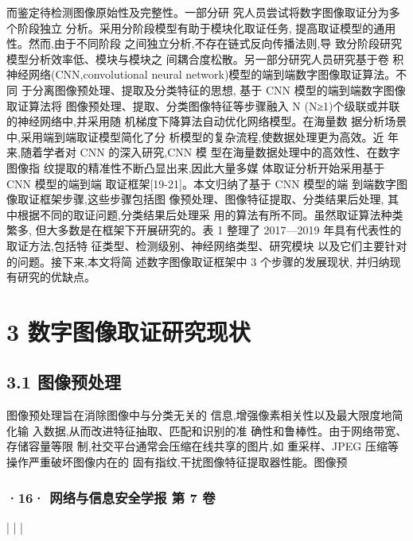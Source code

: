 \documentclass{article}
\begin{document}
而鉴定待检测图像原始性及完整性。一部分研 究人员尝试将数字图像取证分为多个阶段独立 分析。采用分阶段模型有助于模块化取证任务, 提高取证模型的通用性。然而,由于不同阶段 之间独立分析,不存在链式反向传播法则,导 致分阶段研究模型分析效率低、模块与模块之 间耦合度松散。另一部分研究人员研究基于卷 积神经网络(CNN,convolutional neural network)模型的端到端数字图像取证算法。不同 于分离图像预处理、提取及分类特征的思想, 基于 CNN 模型的端到端数字图像取证算法将 图像预处理、提取、分类图像特征等步骤融入 N (N≥1)个级联或并联的神经网络中,并采用随 机梯度下降算法自动优化网络模型。在海量数 据分析场景中,采用端到端取证模型简化了分 析模型的复杂流程,使数据处理更为高效。近 年来,随着学者对 CNN 的深入研究,CNN 模 型在海量数据处理中的高效性、在数字图像指 纹提取的精准性不断凸显出来,因此大量多媒 体取证分析开始采用基于 CNN 模型的端到端 取证框架[19-21]。本文归纳了基于 CNN 模型的端 到端数字图像取证框架步骤,这些步骤包括图 像预处理、图像特征提取、分类结果后处理, 其中根据不同的取证问题,分类结果后处理采 用的算法有所不同。虽然取证算法种类繁多, 但大多数是在框架下开展研究的。表 1 整理了 2017—2019 年具有代表性的取证方法,包括特 征类型、检测级别、神经网络类型、研究模块 以及它们主要针对的问题。接下来,本文将简 述数字图像取证框架中 3 个步骤的发展现状, 并归纳现有研究的优缺点。

\section{3 数字图像取证研究现状}

\subsection{\textbf{3.1} 图像预处理}

图像预处理旨在消除图像中与分类无关的 信息,增强像素相关性以及最大限度地简化输 入数据,从而改进特征抽取、匹配和识别的准 确性和鲁棒性。由于网络带宽、存储容量等限 制,社交平台通常会压缩在线共享的图片,如 重采样、JPEG 压缩等操作严重破坏图像内在的 固有指纹,干扰图像特征提取器性能。图像预

\subsubsection{·16· 网络与信息安全学报 第 7 卷}

|
|  |
\end{document}

